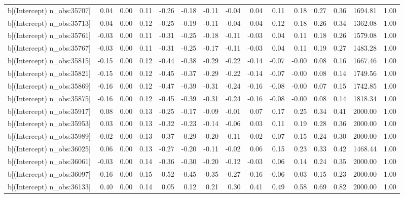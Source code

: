 \begin{table}[ht]
\begin{tabular}{rrrrrrrrrrrrrrr}
  b[(Intercept) n\_obs:35707] & 0.04 & 0.00 & 0.11 & -0.26 & -0.18 & -0.11 & -0.04 & 0.04 & 0.11 & 0.18 & 0.27 & 0.36 & 1694.81 & 1.00 \\ 
  b[(Intercept) n\_obs:35713] & 0.04 & 0.00 & 0.12 & -0.25 & -0.19 & -0.11 & -0.04 & 0.04 & 0.12 & 0.18 & 0.26 & 0.34 & 1362.08 & 1.00 \\ 
  b[(Intercept) n\_obs:35761] & -0.03 & 0.00 & 0.11 & -0.31 & -0.25 & -0.18 & -0.11 & -0.03 & 0.04 & 0.11 & 0.18 & 0.26 & 1579.08 & 1.00 \\ 
  b[(Intercept) n\_obs:35767] & -0.03 & 0.00 & 0.11 & -0.31 & -0.25 & -0.17 & -0.11 & -0.03 & 0.04 & 0.11 & 0.19 & 0.27 & 1483.28 & 1.00 \\ 
  b[(Intercept) n\_obs:35815] & -0.15 & 0.00 & 0.12 & -0.44 & -0.38 & -0.29 & -0.22 & -0.14 & -0.07 & -0.00 & 0.08 & 0.16 & 1667.46 & 1.00 \\ 
  b[(Intercept) n\_obs:35821] & -0.15 & 0.00 & 0.12 & -0.45 & -0.37 & -0.29 & -0.22 & -0.14 & -0.07 & -0.00 & 0.08 & 0.14 & 1749.56 & 1.00 \\ 
  b[(Intercept) n\_obs:35869] & -0.16 & 0.00 & 0.12 & -0.47 & -0.39 & -0.31 & -0.24 & -0.16 & -0.08 & -0.00 & 0.07 & 0.15 & 1742.85 & 1.00 \\ 
  b[(Intercept) n\_obs:35875] & -0.16 & 0.00 & 0.12 & -0.45 & -0.39 & -0.31 & -0.24 & -0.16 & -0.08 & -0.00 & 0.08 & 0.14 & 1818.34 & 1.00 \\ 
  b[(Intercept) n\_obs:35917] & 0.08 & 0.00 & 0.13 & -0.25 & -0.17 & -0.09 & -0.01 & 0.07 & 0.17 & 0.25 & 0.34 & 0.41 & 2000.00 & 1.00 \\ 
  b[(Intercept) n\_obs:35953] & 0.03 & 0.00 & 0.13 & -0.32 & -0.23 & -0.14 & -0.06 & 0.03 & 0.11 & 0.19 & 0.28 & 0.36 & 2000.00 & 1.00 \\ 
  b[(Intercept) n\_obs:35989] & -0.02 & 0.00 & 0.13 & -0.37 & -0.29 & -0.20 & -0.11 & -0.02 & 0.07 & 0.15 & 0.24 & 0.30 & 2000.00 & 1.00 \\ 
  b[(Intercept) n\_obs:36025] & 0.06 & 0.00 & 0.13 & -0.27 & -0.20 & -0.11 & -0.02 & 0.06 & 0.15 & 0.23 & 0.33 & 0.42 & 1468.44 & 1.00 \\ 
  b[(Intercept) n\_obs:36061] & -0.03 & 0.00 & 0.14 & -0.36 & -0.30 & -0.20 & -0.12 & -0.03 & 0.06 & 0.14 & 0.24 & 0.35 & 2000.00 & 1.00 \\ 
  b[(Intercept) n\_obs:36097] & -0.16 & 0.00 & 0.15 & -0.52 & -0.45 & -0.35 & -0.27 & -0.16 & -0.06 & 0.03 & 0.15 & 0.23 & 2000.00 & 1.00 \\ 
  b[(Intercept) n\_obs:36133] & 0.40 & 0.00 & 0.14 & 0.05 & 0.12 & 0.21 & 0.30 & 0.41 & 0.49 & 0.58 & 0.69 & 0.82 & 2000.00 & 1.00 \\ 

\end{tabular}
\end{table}
